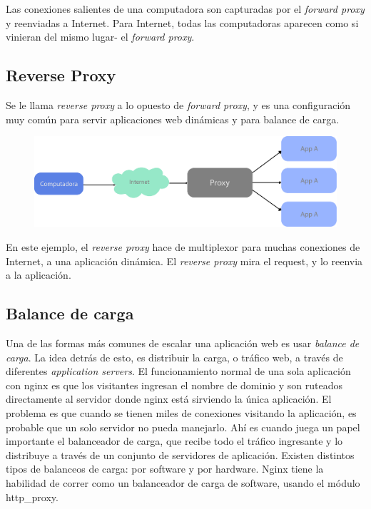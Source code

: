 Las conexiones salientes de una computadora son capturadas por el \textit{forward proxy} y reenviadas a Internet. Para Internet, todas las computadoras aparecen como si vinieran del mismo lugar- el \textit{forward proxy}.


\subsection[Reverse Proxy]{Reverse Proxy}

Se le llama \textit{reverse proxy} a lo opuesto de \textit{forward proxy}, y es una configuración muy común para servir aplicaciones web dinámicas y para balance de carga.

\begin{figure}[h!]
  \centering
    \includegraphics[scale=0.7]{images/reverse-proxy.png}
  \label{fig:reverseproxy}
\end{figure}

En este ejemplo, el \textit{reverse proxy} hace de multiplexor para muchas conexiones de Internet, a una aplicación dinámica. El \textit{reverse proxy} mira el request, y lo reenvia a la aplicación.

\subsection[Balance de carga]{Balance de carga}

Una de las formas más comunes de escalar una aplicación web es usar \textit{balance de carga}. La idea detrás de esto, es distribuir la carga, o tráfico web, a través de diferentes \textit{application servers}.
El funcionamiento normal de una sola aplicación con nginx es que los visitantes ingresan el nombre de dominio y son ruteados directamente al servidor donde nginx está sirviendo la única aplicación. El problema es que cuando se tienen miles de conexiones visitando la aplicación, es probable que un solo servidor no pueda manejarlo. 
Ahí es cuando juega un papel importante el balanceador de carga, que recibe todo el tráfico ingresante y lo distribuye a través de un conjunto de servidores de aplicación.
Existen distintos tipos de balanceos de carga: por software y por hardware. Nginx tiene la habilidad de correr como un balanceador de carga de software, usando el módulo http\_proxy.

